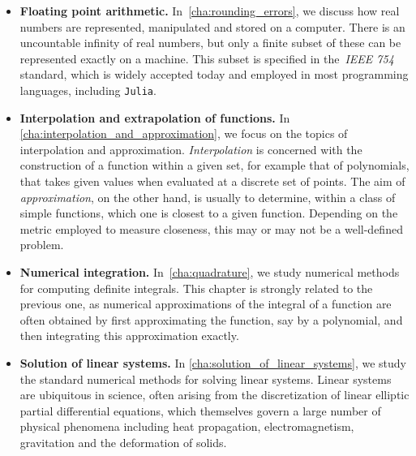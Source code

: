 \begin{itemize}
    \item
        \textbf{Floating point arithmetic.}
        In~\cref{cha:rounding_errors},
        we discuss how real numbers are represented, manipulated and stored on a computer.
        There is an uncountable infinity of real numbers,
        but only a finite subset of these can be represented exactly on a machine.
        This subset is specified in the~\emph{IEEE 754} standard,
        which is widely accepted today and employed in most programming languages, including \texttt{Julia}.

    \item
        \textbf{Interpolation and extrapolation of functions.}
        In \cref{cha:interpolation_and_approximation},
        we focus on the topics of interpolation and approximation.
        \emph{Interpolation} is concerned with the construction of a function within a given set,
        for example that of polynomials,
        that takes given values when evaluated at a discrete set of points.
        The aim of \emph{approximation}, on the other hand,
        is usually to determine, within a class of simple functions,
        which one is closest to a given function.
        Depending on the metric employed to measure closeness,
        this may or may not be a well-defined problem.

    \item
        \textbf{Numerical integration.}
        In~\cref{cha:quadrature},
        we study numerical methods for computing definite integrals.
        This chapter is strongly related to the previous one,
        as numerical approximations of the integral of a function are often obtained by first approximating the function,
        say by a polynomial, and then integrating this approximation exactly.

    \item
        \textbf{Solution of linear systems.}
        In \cref{cha:solution_of_linear_systems},
        we study the standard numerical methods for solving linear systems.
        Linear systems are ubiquitous in science,
        often arising from the discretization of linear elliptic partial differential equations,
        which themselves govern a large number of physical phenomena including heat propagation, electromagnetism, gravitation and the deformation of solids.


\end{itemize}
